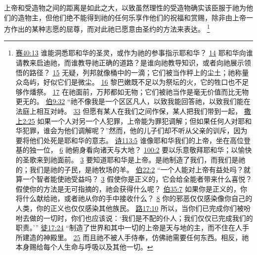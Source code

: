\documentclass[12pt, a4paper, oneside]{ctexart}
\newcounter{parnum}[section]
\newcommand{\N}{%
   \noindent\refstepcounter{parnum}%
    \makebox[\parindent][l]{\textbf{\arabic{parnum}.}}}
\begin{document}
\N 上帝和受造物之间的距离是如此之大，以致虽然理性的受造物确实该臣服于祂为他们的造物主，但他们绝不能得到祂的任何乐享作他们的祝福和赏赐，除非由上帝一方作出的某种志愿的屈尊，而对此祂已愿意由圣约的方法来表达。
	\footnote {
		\href{https://biblehub.com/isaiah/40-13.htm}{赛40:13} 谁能洞悉耶和华的圣灵，或作为祂的参事指示耶和华？
		\href{https://biblehub.com/isaiah/40-14.htm}{14} 耶和华向谁请教来启迪祂，而谁教导祂正确的道路？是谁向祂教导知识，或者向祂展示领悟的路径？
		\href{https://biblehub.com/isaiah/40-15.htm}{15} 无疑，列邦就像桶中的一滴；它们被当作秤上的尘土；祂称量众岛屿，好似它们是微尘。
		\href{https://biblehub.com/isaiah/40-16.htm}{16} 黎巴嫩既不足以为祭坛的火，它的牲口也不足够作燔祭。
		\href{https://biblehub.com/isaiah/40-17.htm}{17} 在祂面前，万邦都如无物；它们被祂当作是毫无价值而比无物更无的。
		\href{https://biblehub.com/job/9-32.htm}{伯9:32} “祂不像我是一个区区凡人，以致我能回答祂，以致我们能在法庭上相互对峙。
		\href{https://biblehub.com/job/9-33.htm}{33} 但愿有某人在我们之间作保，某人把我们带到一起，
		\href{https://biblehub.com/1_samuel/2-25.htm}{撒上2:25} 如果一个人对另一个人犯罪，上帝能为罪犯调解；但如果任何人对耶和华犯罪，谁会为他们调解呢？”然而，他的儿子们却不听从父亲的训斥，因为要将他们处死是耶和华的意志。
		\href{https://biblehub.com/psalms/113-5.htm}{诗113:5} 谁像耶和华我们的上帝，坐在高位登基的独一位，
		\href{https://biblehub.com/psalms/113-6.htm}{6} 祂俯身看向诸天与大地？
		\href{https://biblehub.com/psalms/100-2.htm}{100:2} 要以乐意敬拜耶和华；以愉快的圣歌来到祂面前。
		\href{https://biblehub.com/psalms/100-3.htm}{3} 要知道耶和华是上帝。是祂制造了我们，而我们是祂的；我们是祂的子民，是祂牧场的羊。
		\href{https://biblehub.com/job/22-2.htm}{伯22:2} “一个人能对上帝有益处吗？就算一个智者能使祂受益吗？
		\href{https://biblehub.com/job/22-3.htm}{3} 假使你是正义的，它会给全能者带来什么喜悦？假使你的方法是无可指摘的，祂会获得什么呢？
		\href{https://biblehub.com/job/35-7.htm}{伯35:7} 如果你是正义的，你将什么献给祂，或者祂从你的手中接收什么？
		\href{https://biblehub.com/job/35-8.htm}{8} 你的邪恶仅仅感染像你自己的人类，你的正义也仅仅感染其他族民。
		\href{https://biblehub.com/luke/17-10.htm}{路17:10} 所以，当你们已完成你们被吩咐去做的一切时，你们也应该说：‘我们是不配的仆人；我们仅仅已完成我们的职责。’”
		\href{https://biblehub.com/acts/17-24.htm}{徒17:24} “制造了世界和其中一切的上帝是天与地的主，而不住在人手所建造的神殿里。
		\href{https://biblehub.com/acts/17-25.htm}{25} 而且祂不被人手侍奉，仿佛祂需要任何东西。相反，祂本身赐给每个人生命与呼吸以及其他一切。
	}
\end{document}
